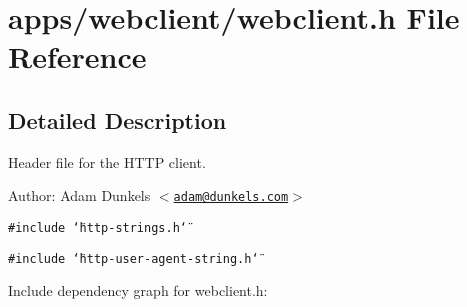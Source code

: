 \hypertarget{a00049}{
\section{apps/webclient/webclient.h File Reference}
\label{a00049}
}


\subsection{Detailed Description}
Header file for the HTTP client. 

\begin{Desc}
\item[Author:]Adam Dunkels $<$\href{mailto:adam@dunkels.com}{\tt adam@dunkels.com}$>$ \end{Desc}


{\tt \#include \char`\"{}http-strings.h\char`\"{}}\par
{\tt \#include \char`\"{}http-user-agent-string.h\char`\"{}}\par


Include dependency graph for webclient.h:

